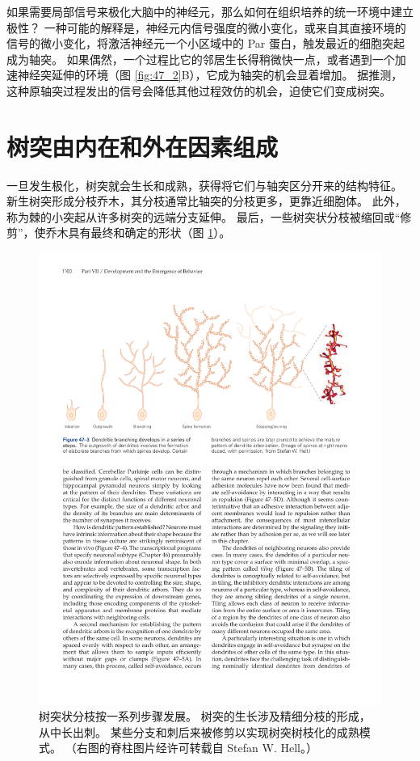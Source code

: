 如果需要局部信号来极化大脑中的神经元，那么如何在组织培养的统一环境中建立极性？
一种可能的解释是，神经元内信号强度的微小变化，或来自其直接环境的信号的微小变化，将激活神经元一个小区域中的 Par 蛋白，触发最近的细胞突起成为轴突。
如果偶然，一个过程比它的邻居生长得稍微快一点，或者遇到一个加速神经突延伸的环境（图 \ref{fig:47_2}B），它成为轴突的机会显着增加。
据推测，这种原轴突过程发出的信号会降低其他过程效仿的机会，迫使它们变成树突。



\section{树突由内在和外在因素组成}

一旦发生极化，树突就会生长和成熟，获得将它们与轴突区分开来的结构特征。
新生树突形成分枝乔木，其分枝通常比轴突的分枝更多，更靠近细胞体。
此外，称为棘的小突起从许多树突的远端分支延伸。
最后，一些树突状分枝被缩回或“修剪”，使乔木具有最终和确定的形状（图 \ref{fig:47_3}）。


\begin{figure}[htbp]
	\centering
	\includegraphics[width=0.95\linewidth]{chap47/fig_47_3}
	\caption{树突状分枝按一系列步骤发展。 树突的生长涉及精细分枝的形成，从中长出刺。 某些分支和刺后来被修剪以实现树突树枝化的成熟模式。 （右图的脊柱图片经许可转载自 Stefan W. Hell。）}
	\label{fig:47_3}
\end{figure}


